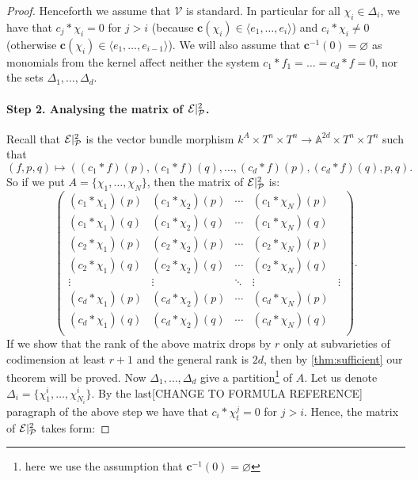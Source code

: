 \begin{proof}
    Henceforth we assume that $\mathcal V$ is standard. In particular for all $\chi_i \in \Delta_i$, we have that $c_j * \chi_i = 0$ for $j > i$ (because $\mathbf c(\chi_i) \in \langle e_1, \dots, e_i \rangle$) and $c_i * \chi_i \ne 0$ (otherwise $\mathbf c(\chi_i) \in \langle e_1, \dots, e_{i - 1} \rangle$). We will also assume that $\mathbf c^{-1} (0) = \varnothing$ as monomials from the kernel affect neither the system $c_1 * f_1 = \dots = c_d * f = 0$, nor the sets $\Delta_1, \dots, \Delta_d$.

    \paragraph{Step 2. Analysing the matrix of $\mathcal E|_\P^2$.} Recall that $\E|_\P^2$ is the vector bundle morphism $k^A \times T^n \times T^n \to \mathbb A^{2d} \times T^n \times T^n$ such that
    \[
    (f, p, q) \mapsto ((c_1 * f) (p), (c_1 * f)(q), \dots, (c_d * f)(p), (c_d * f)(q), p, q).
    \]
    So if we put $A = \{ \chi_1, \dots, \chi_N \}$, then the matrix of $\mathcal E|^2_\P$ is:
    \[
    \begin{pmatrix}
        (c_1 * \chi_1) (p) & (c_1 * \chi_2)(p) & \cdots & (c_1 * \chi_N) (p) \\
        (c_1 * \chi_1) (q) & (c_1 * \chi_2)(q) & \cdots & (c_1 * \chi_N) (q) \\
        (c_2 * \chi_1) (p) & (c_2 * \chi_2)(p) & \cdots & (c_2 * \chi_N) (p) \\
        (c_2 * \chi_1) (q) & (c_2 * \chi_2)(q) & \cdots & (c_2 * \chi_N) (q) \\
        \vdots & \vdots & \ddots & \vdots & \vdots \\
        (c_d * \chi_1) (p) & (c_d * \chi_2)(p) & \cdots & (c_d * \chi_N) (p) \\
        (c_d * \chi_1) (q) & (c_d * \chi_2)(q) & \cdots & (c_d * \chi_N) (q) \\
    \end{pmatrix}.
    \]
    If we show that the rank of the above matrix drops by $r$ only at subvarieties of codimension at least $r + 1$ and the general rank is $2d$, then by \autoref{thm:sufficient} our theorem will be proved. Now $\Delta_1, \dots, \Delta_d$ give a partition\footnote{here we use the assumption that $\mathbf c^{-1} (0) = \varnothing$} of $A$. Let us denote $\Delta_i = \{ \chi^i_1, \dots, \chi^i_{N_i} \}$. By the last[CHANGE TO FORMULA REFERENCE] paragraph of the above step we have that $c_i * \chi^j_t = 0$ for $j > i$. Hence, the matrix of $\mathcal E|^2_\P$ takes form:

\end{proof}
